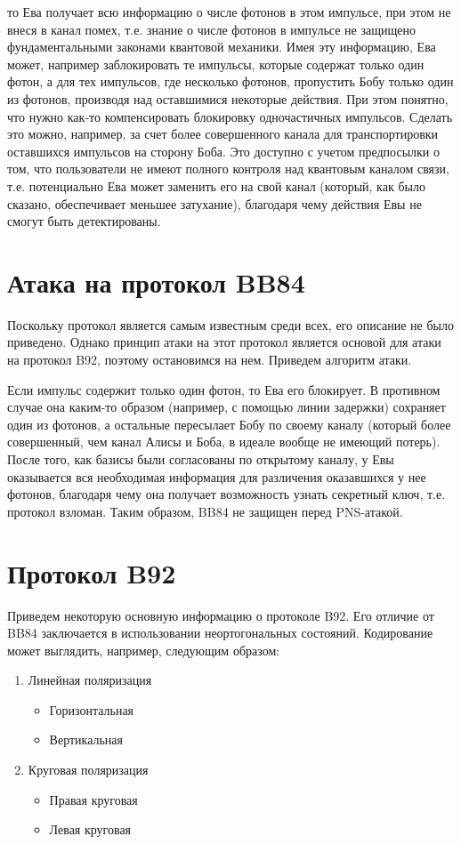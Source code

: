 \documentclass[a4paper, 12pt]{article}
\begin{document}
то Ева получает всю информацию о числе фотонов в этом импульсе, при этом не внеся в канал помех, т.е. знание о числе фотонов в импульсе не защищено фундаментальными законами квантовой механики. Имея эту информацию, Ева может, например заблокировать те импульсы, которые содержат только один фотон, а для тех импульсов, где несколько фотонов, пропустить Бобу только один из фотонов, производя над оставшимися некоторые действия. При этом понятно, что нужно как-то компенсировать блокировку одночастичных импульсов. Сделать это можно, например, за счет более совершенного канала для транспортировки оставшихся импульсов на сторону Боба. Это доступно с учетом предпосылки о том, что пользователи не имеют полного контроля над квантовым каналом связи, т.е. потенциально Ева может заменить его на свой канал (который, как было сказано, обеспечивает меньшее затухание), благодаря чему действия Евы не смогут быть детектированы.


\section{Атака на протокол BB84}

Поскольку протокол является самым известным среди всех, его описание не было приведено. Однако принцип атаки на этот протокол является основой для атаки на протокол B92, поэтому остановимся на нем. Приведем алгоритм атаки.

Если импульс содержит только один фотон, то Ева его блокирует. В противном случае она каким-то образом (например, с помощью линии задержки) сохраняет один из фотонов, а остальные пересылает Бобу по своему каналу (который более совершенный, чем канал Алисы и Боба, в идеале вообще не имеющий потерь). После того, как базисы были согласованы по открытому каналу, у Евы оказывается вся необходимая информация для различения оказавшихся у нее фотонов, благодаря чему она получает возможность узнать секретный ключ, т.е. протокол взломан. Таким образом, BB84 не защищен перед PNS-атакой.

\section{Протокол B92}

Приведем некоторую основную информацию о протоколе B92. Его отличие от BB84 заключается в использовании неортогональных состояний. Кодирование может выглядить, например, следующим образом:

\begin{enumerate}
	\item Линейная поляризация
	\begin{itemize}
		\item Горизонтальная
		
		\item Вертикальная
	\end{itemize}
	\item Круговая поляризация
	\begin{itemize}
		\item Правая круговая
		
		\item Левая круговая
	\end{itemize}
\end{enumerate}
\end{document}
